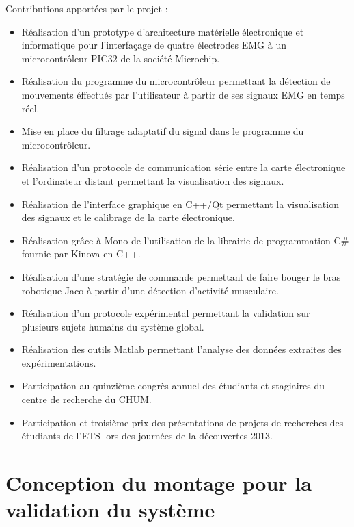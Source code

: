 \documentclass[letterpaper, twoside, 12pt, memoire, creativecommons, hyperref]{thETS}
\begin{document}
\begin{contributions}

Contributions apportées par le projet :

\begin{itemize}
 \item Réalisation d'un prototype d'architecture matérielle électronique et informatique pour l'interfaçage de quatre électrodes EMG à un microcontrôleur PIC32 de la société Microchip.
 \item Réalisation du programme du microcontrôleur permettant la détection de mouvements éffectués par l'utilisateur à partir de ses signaux EMG en temps réel.
 \item Mise en place du filtrage adaptatif du signal dans le programme du microcontrôleur.
 \item Réalisation d'un protocole de communication série entre la carte électronique et l'ordinateur distant permettant la visualisation des signaux.
 \item Réalisation de l'interface graphique en C++/Qt permettant la visualisation des signaux et le calibrage de la carte électronique.
 \item Réalisation grâce à Mono de l'utilisation de la librairie de programmation C\# fournie par Kinova en C++.
 \item Réalisation d'une stratégie de commande permettant de faire bouger le bras robotique Jaco à partir d'une détection d'activité musculaire.
 \item Réalisation d'un protocole expérimental permettant la validation sur plusieurs sujets humains du système global.
 \item Réalisation des outils Matlab permettant l'analyse des données extraites des expérimentations.
 \item Participation au quinzième congrès annuel des étudiants et stagiaires du centre de recherche du CHUM.
 \item Participation et troisième prix des présentations de projets de recherches des étudiants de l'ETS lors des journées de la découvertes 2013.
\end{itemize}

\end{contributions}


\appendix


\multiannexe %
%
\chapter{Conception du montage pour la validation du système} 
\label{annexemontage}
\end{document}
